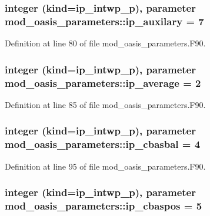 \hypertarget{classmod__oasis__parameters_a4e90463865a09309212e947e8c8546ac}{
\subsubsection[{ip\+\_\+auxilary}]{\setlength{\rightskip}{0pt plus 5cm}integer (kind=ip\+\_\+intwp\+\_\+p), parameter mod\+\_\+oasis\+\_\+parameters\+::ip\+\_\+auxilary = 7}}\label{classmod__oasis__parameters_a4e90463865a09309212e947e8c8546ac}


Definition at line 80 of file mod\+\_\+oasis\+\_\+parameters.\+F90.

\hypertarget{classmod__oasis__parameters_a5e40e91da22fca8f2b6a9d4f1c1ace5d}{
\subsubsection[{ip\+\_\+average}]{\setlength{\rightskip}{0pt plus 5cm}integer (kind=ip\+\_\+intwp\+\_\+p), parameter mod\+\_\+oasis\+\_\+parameters\+::ip\+\_\+average = 2}}\label{classmod__oasis__parameters_a5e40e91da22fca8f2b6a9d4f1c1ace5d}


Definition at line 85 of file mod\+\_\+oasis\+\_\+parameters.\+F90.

\hypertarget{classmod__oasis__parameters_aaa7ead98ff7d53acfd539a32fca9e2c7}{
\subsubsection[{ip\+\_\+cbasbal}]{\setlength{\rightskip}{0pt plus 5cm}integer (kind=ip\+\_\+intwp\+\_\+p), parameter mod\+\_\+oasis\+\_\+parameters\+::ip\+\_\+cbasbal = 4}}\label{classmod__oasis__parameters_aaa7ead98ff7d53acfd539a32fca9e2c7}


Definition at line 95 of file mod\+\_\+oasis\+\_\+parameters.\+F90.

\hypertarget{classmod__oasis__parameters_a3b96d31bbe142d84df2b93880498936f}{
\subsubsection[{ip\+\_\+cbaspos}]{\setlength{\rightskip}{0pt plus 5cm}integer (kind=ip\+\_\+intwp\+\_\+p), parameter mod\+\_\+oasis\+\_\+parameters\+::ip\+\_\+cbaspos = 5}}\label{classmod__oasis__parameters_a3b96d31bbe142d84df2b93880498936f}


